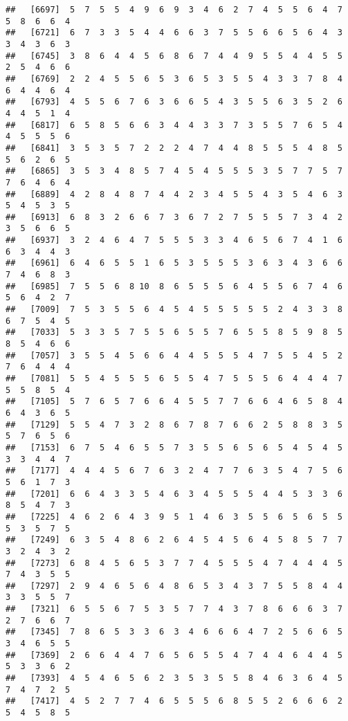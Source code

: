 \documentclass[
]{book}
\begin{document}
\begin{verbatim}
##   [6697]  5  7  5  5  4  9  6  9  3  4  6  2  7  4  5  5  6  4  7  5  8  6  6  4
##   [6721]  6  7  3  3  5  4  4  6  6  3  7  5  5  6  6  5  6  4  3  3  4  3  6  3
##   [6745]  3  8  6  4  4  5  6  8  6  7  4  4  9  5  5  4  4  5  5  2  5  4  6  6
##   [6769]  2  2  4  5  5  6  5  3  6  5  3  5  5  4  3  3  7  8  4  6  4  4  6  4
##   [6793]  4  5  5  6  7  6  3  6  6  5  4  3  5  5  6  3  5  2  6  4  4  5  1  4
##   [6817]  6  5  8  5  6  6  3  4  4  3  3  7  3  5  5  7  6  5  4  4  5  5  5  6
##   [6841]  3  5  3  5  7  2  2  2  4  7  4  4  8  5  5  5  4  8  5  5  6  2  6  5
##   [6865]  3  5  3  4  8  5  7  4  5  4  5  5  5  3  5  7  7  5  7  7  6  4  6  4
##   [6889]  4  2  8  4  8  7  4  4  2  3  4  5  5  4  3  5  4  6  3  5  4  5  3  5
##   [6913]  6  8  3  2  6  6  7  3  6  7  2  7  5  5  5  7  3  4  2  3  5  6  6  5
##   [6937]  3  2  4  6  4  7  5  5  5  3  3  4  6  5  6  7  4  1  6  6  3  4  4  3
##   [6961]  6  4  6  5  5  1  6  5  3  5  5  5  3  6  3  4  3  6  6  7  4  6  8  3
##   [6985]  7  5  5  6  8 10  8  6  5  5  5  6  4  5  5  6  7  4  6  5  6  4  2  7
##   [7009]  7  5  3  5  5  6  4  5  4  5  5  5  5  5  2  4  3  3  8  6  7  5  4  5
##   [7033]  5  3  3  5  7  5  5  6  5  5  7  6  5  5  8  5  9  8  5  8  5  4  6  6
##   [7057]  3  5  5  4  5  6  6  4  4  5  5  5  4  7  5  5  4  5  2  7  6  4  4  4
##   [7081]  5  5  4  5  5  5  6  5  5  4  7  5  5  5  6  4  4  4  7  5  5  8  5  4
##   [7105]  5  7  6  5  7  6  6  4  5  5  7  7  6  6  4  6  5  8  4  6  4  3  6  5
##   [7129]  5  5  4  7  3  2  8  6  7  8  7  6  6  2  5  8  8  3  5  5  7  6  5  6
##   [7153]  6  7  5  4  6  5  5  7  3  5  5  6  5  6  5  4  5  4  5  3  3  4  4  7
##   [7177]  4  4  4  5  6  7  6  3  2  4  7  7  6  3  5  4  7  5  6  5  6  1  7  3
##   [7201]  6  6  4  3  3  5  4  6  3  4  5  5  5  4  4  5  3  3  6  8  5  4  7  3
##   [7225]  4  6  2  6  4  3  9  5  1  4  6  3  5  5  6  5  6  5  5  5  3  5  7  5
##   [7249]  6  3  5  4  8  6  2  6  4  5  4  5  6  4  5  8  5  7  7  3  2  4  3  2
##   [7273]  6  8  4  5  6  5  3  7  7  4  5  5  5  4  7  4  4  4  5  7  4  3  5  5
##   [7297]  2  9  4  6  5  6  4  8  6  5  3  4  3  7  5  5  8  4  4  3  3  5  5  7
##   [7321]  6  5  5  6  7  5  3  5  7  7  4  3  7  8  6  6  6  3  7  2  7  6  6  7
##   [7345]  7  8  6  5  3  3  6  3  4  6  6  6  4  7  2  5  6  6  5  3  4  6  5  5
##   [7369]  2  6  6  4  4  7  6  5  6  5  5  4  7  4  4  6  4  4  5  5  3  3  6  2
##   [7393]  4  5  4  6  5  6  2  3  5  3  5  5  8  4  6  3  6  4  5  7  4  7  2  5
##   [7417]  4  5  2  7  7  4  6  5  5  5  6  8  5  5  2  6  6  6  2  5  4  5  8  5

\end{verbatim}
\end{document}
